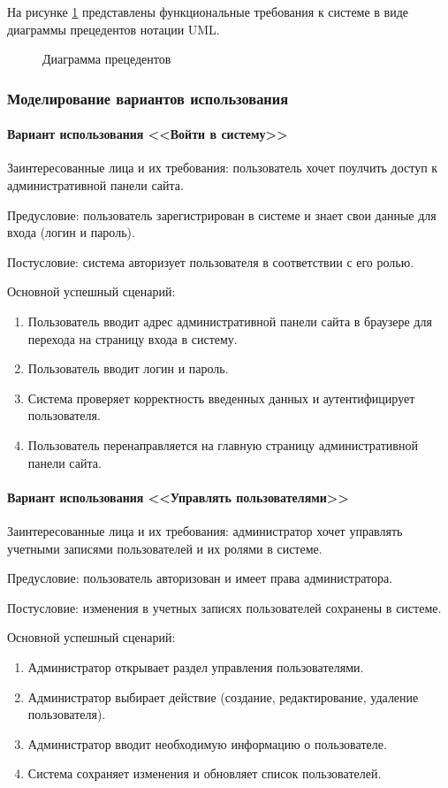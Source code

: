 На рисунке \ref{usecase:image} представлены функциональные требования к системе в виде диаграммы прецедентов нотации UML.

\begin{figure}[ht]
	\caption{Диаграмма прецедентов}
	\label{usecase:image}
\end{figure}

\subsubsection{Моделирование вариантов использования}
\paragraph{Вариант использования <<Войти в систему>>}
Заинтересованные лица и их требования: пользователь хочет поулчить доступ к административной панели сайта.

Предусловие: пользователь зарегистрирован в системе и знает свои данные для входа (логин и пароль).

Постусловие: система авторизует пользователя в соответствии с его ролью.

Основной успешный сценарий:
\begin{enumerate}
	\item Пользователь вводит адрес административной панели сайта в браузере для перехода на страницу входа в систему.
	\item Пользователь вводит логин и пароль.
	\item Система проверяет корректность введенных данных и аутентифицирует пользователя.
	\item Пользователь перенаправляется на главную страницу административной панели сайта.
\end{enumerate}

\paragraph{Вариант использования <<Управлять пользователями>>}
Заинтересованные лица и их требования: администратор хочет управлять учетными записями пользователей и их ролями в системе.

Предусловие: пользователь авторизован и имеет права администратора.

Постусловие: изменения в учетных записях пользователей сохранены в системе.

Основной успешный сценарий:
\begin{enumerate}
	\item Администратор открывает раздел управления пользователями.
	\item Администратор выбирает действие (создание, редактирование, удаление пользователя).
	\item Администратор вводит необходимую информацию о пользователе.
	\item Система сохраняет изменения и обновляет список пользователей.
\end{enumerate}

